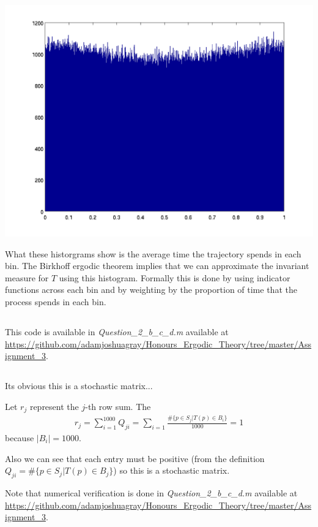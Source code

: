 \documentclass{unswmaths}
\begin{document}
\includegraphics[scale=0.3]{qn_2_a_hist_10}

What these historgrams show is the average time the trajectory spends in each bin. The Birkhoff ergodic theorem implies that we can approximate the invariant measure for $ T $ using this histogram. Formally this is done by using indicator functions across each bin and by weighting by the proportion of time that the process spends in each bin.

\subsection{}
This code is available in \emph{Question\_2\_b\_c\_d.m} available at \url{https://github.com/adamjoshuagray/Honours_Ergodic_Theory/tree/master/Assignment_3}.

\subsection{}

Its obvious this is a stochastic matrix...

Let $ r_j $ represent the $j$-th row sum.
The 
\begin{align}
  r_j = \sum_{i=1}^{1000} Q_{ji} = \sum_{i=1}\frac{\#\{ p \in S_j| T(p) \in B_i \}}{1000} = 1
\end{align}
because $ |B_i| = 1000 $.

Also we can see that each entry must be positive (from the definition $ Q_{ji} = \#\{p \in S_j | T(p) \in B_j \} $)
so this is a stochastic matrix.

Note that numerical verification is done in  \emph{Question\_2\_b\_c\_d.m} available at \url{https://github.com/adamjoshuagray/Honours_Ergodic_Theory/tree/master/Assignment_3}.
\end{document}
